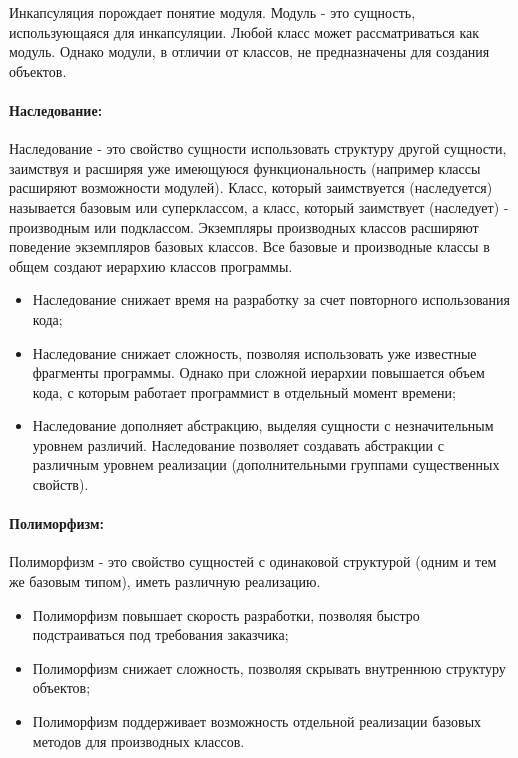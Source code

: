 Инкапсуляция порождает понятие модуля. Модуль - это сущность, использующаяся для инкапсуляции. Любой класс может рассматриваться как модуль. Однако модули, в отличии от классов, не предназначены для создания объектов.

\paragraph*{Наследование:}

Наследование - это свойство сущности использовать структуру другой сущности, заимствуя и расширяя уже имеющуюся функциональность (например классы расширяют возможности модулей). Класс, который заимствуется (наследуется) называется базовым или суперклассом, а класс, который заимствует (наследует) - производным или подклассом. Экземпляры производных классов расширяют поведение экземпляров базовых классов. Все базовые и производные классы в общем создают иерархию классов программы.
\begin{itemize}
  \item Наследование снижает время на разработку за счет повторного использования кода;

  \item Наследование снижает сложность, позволяя использовать уже известные фрагменты программы. Однако при сложной иерархии повышается объем кода, с которым работает программист в отдельный момент времени;

  \item Наследование дополняет абстракцию, выделяя сущности с незначительным уровнем различий. Наследование позволяет создавать абстракции с различным уровнем реализации (дополнительными группами существенных свойств).
\end{itemize}

\paragraph*{Полиморфизм:}
Полиморфизм - это свойство сущностей с одинаковой структурой (одним и тем же базовым типом), иметь различную реализацию.
\begin{itemize}
  \item Полиморфизм повышает скорость разработки, позволяя быстро подстраиваться под требования заказчика;

  \item Полиморфизм снижает сложность, позволяя скрывать внутреннюю структуру объектов;

  \item Полиморфизм поддерживает возможность отдельной реализации базовых методов для производных классов.
\end{itemize}


